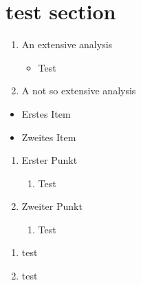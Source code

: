 \documentclass[10pt]{article}
\begin{document}
\section{test section}
\blindtext
\begin{enumerate}
  \item  An extensive analysis 
   \begin{itemize}
     \renewcommand{\labelitemi}{o}
     \item Test
   \end{itemize}
 \item A not so extensive analysis
\end{enumerate}

\blindtext

\begin{itemize}
  \item Erstes Item
  \item[\ding{43}] Zweites Item
\end{itemize}


\begin{enumerate}
  \item Erster Punkt
  \begin{enumerate}
    \item Test
  \end{enumerate}
  \item Zweiter Punkt
  \begin{enumerate}
    \item Test
  \end{enumerate}
\end{enumerate}


\begin{enumerate}
\item test
\item test
\end{enumerate}
\end{document}
